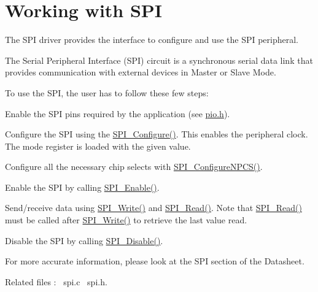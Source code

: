 \hypertarget{group__spi__module}{}\section{Working with S\+PI}
\label{group__spi__module}
The S\+PI driver provides the interface to configure and use the S\+PI peripheral.

The Serial Peripheral Interface (S\+PI) circuit is a synchronous serial data link that provides communication with external devices in Master or Slave Mode.

To use the S\+PI, the user has to follow these few steps\+:
\begin{DoxyEnumerate}
\item Enable the S\+PI pins required by the application (see \mbox{\hyperlink{pio_8h}{pio.\+h}}).
\item Configure the S\+PI using the \mbox{\hyperlink{arm_2atsam_2contrib_2libraries_2libchip_2source_2spi_8c_a0ebb1d25f8889b00a9dd846059456175}{S\+P\+I\+\_\+\+Configure()}}. This enables the peripheral clock. The mode register is loaded with the given value.
\item Configure all the necessary chip selects with \mbox{\hyperlink{arm_2atsam_2contrib_2libraries_2libchip_2source_2spi_8c_a3f06d5a5d0d4475c4a2a46657235ac92}{S\+P\+I\+\_\+\+Configure\+N\+P\+C\+S()}}.
\item Enable the S\+PI by calling \mbox{\hyperlink{arm_2atsam_2contrib_2libraries_2libchip_2source_2spi_8c_ad983db901253eb7cc58874a4d495a106}{S\+P\+I\+\_\+\+Enable()}}.
\item Send/receive data using \mbox{\hyperlink{arm_2atsam_2contrib_2libraries_2libchip_2source_2spi_8c_a564ab3c6c710a126ae9fc731e46c1294}{S\+P\+I\+\_\+\+Write()}} and \mbox{\hyperlink{arm_2atsam_2contrib_2libraries_2libchip_2source_2spi_8c_a3e757f48d1ee59e6027ac4c4319556ca}{S\+P\+I\+\_\+\+Read()}}. Note that \mbox{\hyperlink{arm_2atsam_2contrib_2libraries_2libchip_2source_2spi_8c_a3e757f48d1ee59e6027ac4c4319556ca}{S\+P\+I\+\_\+\+Read()}} must be called after \mbox{\hyperlink{arm_2atsam_2contrib_2libraries_2libchip_2source_2spi_8c_a564ab3c6c710a126ae9fc731e46c1294}{S\+P\+I\+\_\+\+Write()}} to retrieve the last value read.
\item Disable the S\+PI by calling \mbox{\hyperlink{arm_2atsam_2contrib_2libraries_2libchip_2source_2spi_8c_aa8212f6819071a9ca247a0236b109e98}{S\+P\+I\+\_\+\+Disable()}}.
\end{DoxyEnumerate}

For more accurate information, please look at the S\+PI section of the Datasheet.

Related files \+:~\newline
spi.\+c~\newline
 spi.\+h.~\newline
 